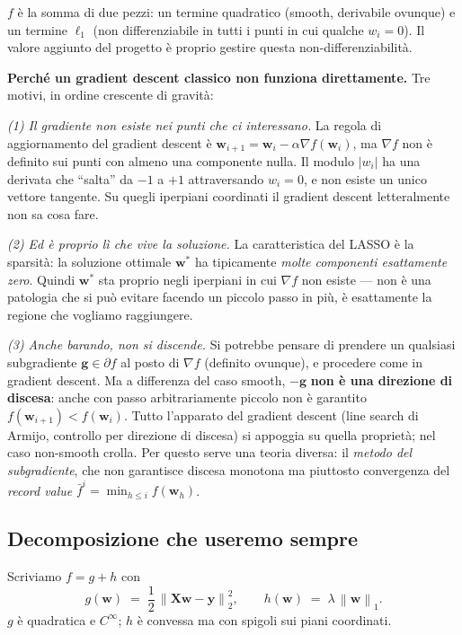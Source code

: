\documentclass[11pt,a4paper]{article}
\newcommand{\norm}[1]{\left\|#1\right\|}
\newcommand{\bw}{\mathbf{w}}
\newcommand{\bg}{\mathbf{g}}
\newcommand{\by}{\mathbf{y}}
\newcommand{\bX}{\mathbf{X}}
\theoremstyle{definition}
\begin{document}
\begin{tcolorbox}[intuition]
$f$ è la somma di due pezzi: un termine quadratico (smooth, derivabile ovunque) e un termine $\ell_1$ (non differenziabile in tutti i punti in cui qualche $w_i=0$). Il valore aggiunto del progetto è proprio gestire questa non-differenziabilità.

\smallskip
\textbf{Perché un gradient descent classico non funziona direttamente.} Tre motivi, in ordine crescente di gravità:

\emph{(1) Il gradiente non esiste nei punti che ci interessano.} La regola di aggiornamento del gradient descent è $\bw_{i+1} = \bw_i - \alpha\nabla f(\bw_i)$, ma $\nabla f$ non è definito sui punti con almeno una componente nulla. Il modulo $|w_i|$ ha una derivata che ``salta'' da $-1$ a $+1$ attraversando $w_i=0$, e non esiste un unico vettore tangente. Su quegli iperpiani coordinati il gradient descent letteralmente non sa cosa fare.

\emph{(2) Ed è proprio lì che vive la soluzione.} La caratteristica del LASSO è la sparsità: la soluzione ottimale $\bw^*$ ha tipicamente \emph{molte componenti esattamente zero}. Quindi $\bw^*$ sta proprio negli iperpiani in cui $\nabla f$ non esiste --- non è una patologia che si può evitare facendo un piccolo passo in più, è esattamente la regione che vogliamo raggiungere.

\emph{(3) Anche barando, non si discende.} Si potrebbe pensare di prendere un qualsiasi subgradiente $\bg\in\partial f$ al posto di $\nabla f$ (definito ovunque), e procedere come in gradient descent. Ma a differenza del caso smooth, $-\bg$ \textbf{non è una direzione di discesa}: anche con passo arbitrariamente piccolo non è garantito $f(\bw_{i+1}) < f(\bw_i)$. Tutto l'apparato del gradient descent (line search di Armijo, controllo per direzione di discesa) si appoggia su quella proprietà; nel caso non-smooth crolla. Per questo serve una teoria diversa: il \emph{metodo del subgradiente}, che non garantisce discesa monotona ma piuttosto convergenza del \emph{record value} $\bar f^i = \min_{h\le i} f(\bw_h)$.
\end{tcolorbox}

\subsection{Decomposizione che useremo sempre}
Scriviamo $f = g + h$ con
\[
g(\bw) \;=\; \frac{1}{2}\,\norm{\bX\bw-\by}_2^2,\qquad h(\bw) \;=\; \lambda\,\norm{\bw}_1.
\]
$g$ è quadratica e $C^\infty$; $h$ è convessa ma con spigoli sui piani coordinati.
\end{document}
